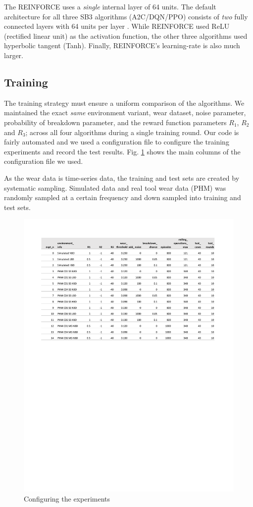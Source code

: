 \documentclass[a4paper, 12pt]{article}
\begin{document}
The REINFORCE uses a \textit{single} internal layer of 64 units. The default architecture for all three SB3 algorithms (A2C/DQN/PPO) consists of \textit{two} fully connected layers with 64 units per layer \citep{SB3-DefaultNetwork}. While REINFORCE used ReLU (rectified linear unit) as the activation function, the other three algorithms used hyperbolic tangent (Tanh). Finally, REINFORCE's learning-rate is also much larger.

\subsection{Training}
The training strategy must ensure a uniform comparison of the algorithms. We maintained the exact \textit{same} environment variant, wear dataset, noise parameter, probability of breakdown parameter, and the reward function parameters $R_1$, $R_2$ and $R_3$; across all four algorithms during a single training round. Our code is fairly automated and we used a configuration file to configure the training experiments and record the test results. Fig. \ref{fig:exptconfig} shows the main columns of the configuration file we used.

As the wear data is time-series data, the training and test sets are created by systematic sampling. Simulated data and real tool wear data (PHM) was randomly sampled at a certain frequency and down sampled into training and test sets.

\begin{figure}[ht]
	\centering	
	\includegraphics[width=\textwidth, trim={1.5cm 15cm 1cm 2cm}, clip]{images/TrainingPlots/Experiments_Sheet_select.pdf}  
	\caption{Configuring the experiments}
	\label{fig:exptconfig}
\end{figure}
\end{document}
